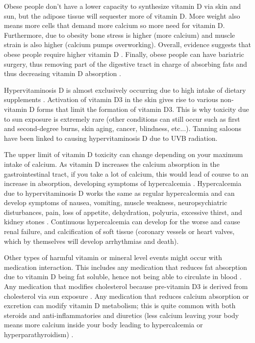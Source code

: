 Obese people don't have a lower capacity to synthesize vitamin D via skin and sun, but the adipose tissue will sequester more of vitamin D. More weight also means more cells that demand more calcium so more need for vitamin D. Furthermore, due to obesity bone stress is higher (more calcium) and muscle strain is also higher (calcium pumps overworking). Overall, evidence suggests that obese people require higher vitamin D \cite{ref:Ekwaru2014, ref:Drincic2013}. Finally, obese people can have bariatric surgery, thus removing part of the digestive tract in charge of absorbing fats and thus decreasing vitamin D absorption \cite{ref:Peterson2016, ref:Chakhtoura2017} .\vspace{3 mm}


Hypervitaminosis D is almost exclusively occurring due to high intake of dietary supplements \cite{ref:Galior2018, ref:Auguste2019, ref:Vogiatzi2014}. Activation of vitamin D3 in the skin gives rise to various non-vitamin D forms that limit the formation of vitamin D3. This is why toxicity due to sun exposure is extremely rare (other conditions can still occur such as first and second-degree burns, skin aging, cancer, blindness, etc...). Tanning saloons have been linked to causing hypervitaminosis D due to UVB radiation. \cite{ref:Singh2014, ref:Laurent2017, ref:PrezCastrilln2007}
 
The upper limit of vitamin D toxicity can change depending on your maximum intake of calcium. As vitamin D increases the calcium absorption in the gastrointestinal tract, if you take a lot of calcium, this would lead of course to an increase in absorption, developing symptoms of hypercalcemia \cite{ref:Galior2018}. Hypercalcemia due to hypervitaminosis D works the same as regular hypercalcemia and can develop symptoms of nausea, vomiting, muscle weakness, neuropsychiatric disturbances, pain, loss of appetite, dehydration, polyuria, excessive thirst, and kidney stones \cite{1_Institute_of_Medicine2011-zg, ref:Jackson2006, ref:Malihi2019, ref:Malihi2016}. Continuous hypercalcemia can develop for the worse and cause renal failure, and calcification of soft tissue (coronary vessels or heart valves, which by themselves will develop arrhythmias and death).

Other types of harmful vitamin or mineral level events might occur with medication interaction. This includes any medication that reduces fat absorption due to vitamin D being fat soluble, hence not being able to circulate in blood \cite{ref:Gotfredsen2001, ref:James1997-lf, ref:McDuffie2002, ref:Robien2013}. Any medication that modifies cholesterol because pre-vitamin D3 is derived from cholesterol via sun exposure \cite{ref:Robien2013, ref:Schwartz2008, ref:PrezCastrilln2007, ref:Aloia2007}. Any medication that reduces calcium absorption or excretion can modify vitamin D metabolism; this is quite common with both steroids and anti-inflammatories and diuretics (less calcium leaving your body means more calcium inside your body leading to hypercalcemia or hyperparathyroidism) \cite{ref:Robien2013, ref:Crowe1984-or, ref:DRINKA1984, ref:Skversky2011, ref:Lukert1990, ref:deSvaux2002, ref:Buckley1996}. \vspace{3 mm}

